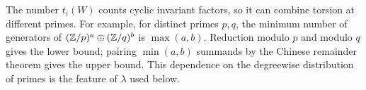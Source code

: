 \begin{remark}\label{rem:torsion-generators}
The number $t_i(W)$ counts cyclic invariant factors, so it can combine
torsion at different primes.  For example, for distinct primes $p,q$,
the minimum number of generators of
$(\mathbb Z/p)^a\oplus(\mathbb Z/q)^b$ is $\max(a,b)$.
Reduction modulo $p$ and modulo $q$ gives the lower bound; pairing
$\min(a,b)$ summands by the Chinese remainder theorem gives the upper
bound.  This dependence on the degreewise distribution of primes is the
feature of $\lambda$ used below.
\end{remark}

